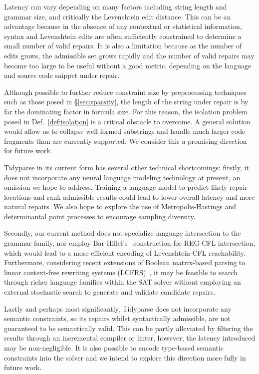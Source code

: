 \documentclass[sigplan,review,anonymous,acmsmall]{acmart}\settopmatter{printfolios=false,printccs=false,printacmref=false}
\begin{document}
Latency can vary depending on many factors including string length and grammar size, and critically the Levenshtein edit distance. This can be an advantage because in the absence of any contextual or statistical information, syntax and Levenshtein edits are often sufficiently constrained to determine a small number of valid repairs. It is also a limitation because as the number of edits grows, the admissible set grows rapidly and the number of valid repairs may become too large to be useful without a good metric, depending on the language and source code snippet under repair.

Although possible to further reduce constraint size by preprocessing techniques such as those posed in \S\ref{sec:sparsity}, the length of the string under repair is by far the dominating factor in formula size. For this reason, the isolation problem posed in Def.~\ref{def:isolation} is a critical obstacle to overcome. A general solution would allow us to collapse well-formed substrings and handle much larger code fragments than are currently supported. We consider this a promising direction for future work.

Tidyparse in its current form has several other technical shortcomings: firstly, it does not incorporate any neural language modeling technology at present, an omission we hope to address. Training a language model to predict likely repair locations and rank admissible results could lead to lower overall latency and more natural repairs. We also hope to explore the use of Metropolis-Hastings and determinantal point processes to encourage sampling diversity.

Secondly, our current method does not specialize language intersection to the grammar family, nor employ Bar-Hillel's~\cite{bar1961formal} construction for REG-CFL intersection, which would lead to a more efficient encoding of Levenshtein-CFL reachability. Furthermore, considering recent extensions of Boolean matrix-based parsing to linear context-free rewriting systems (LCFRS)~\cite{cohen2016parsing}, it may be feasible to search through richer language families within the SAT solver without employing an external stochastic search to generate and validate candidate repairs.

Lastly and perhaps most significantly, Tidyparse does not incorporate any semantic constraints, so its repairs whilst syntactically admissible, are not guaranteed to be semantically valid. This can be partly alleviated by filtering the results through an incremental compiler or linter, however, the latency introduced may be non-negligible. It is also possible to encode type-based semantic constraints into the solver and we intend to explore this direction more fully in future work.
\end{document}
